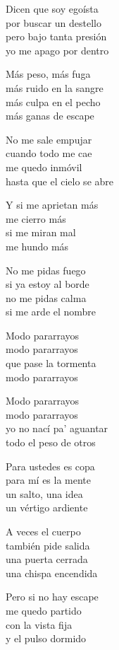 \begin{lyrics}

Dicen que soy egoísta\\
por buscar un destello\\
pero bajo tanta presión\\
yo me apago por dentro

Más peso, más fuga\\
más ruido en la sangre\\
más culpa en el pecho\\
más ganas de escape

No me sale empujar\\
cuando todo me cae\\
me quedo inmóvil\\
hasta que el cielo se abre

Y si me aprietan más\\
me cierro más\\
si me miran mal\\
me hundo más

No me pidas fuego\\
si ya estoy al borde\\
no me pidas calma\\
si me arde el nombre

Modo pararrayos\\
modo pararrayos\\
que pase la tormenta\\
modo pararrayos

Modo pararrayos\\
modo pararrayos\\
yo no nací pa' aguantar\\
todo el peso de otros

Para ustedes es copa\\
para mí es la mente\\
un salto, una idea\\
un vértigo ardiente

A veces el cuerpo\\
también pide salida\\
una puerta cerrada\\
una chispa encendida

Pero si no hay escape\\
me quedo partido\\
con la vista fija\\
y el pulso dormido


\end{lyrics}
